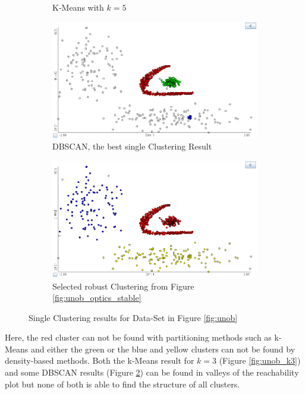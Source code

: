 \documentclass[
	a4paper,
	english,
	twoside,
	openright,               
	11pt                            
	]{report}
\begin{document}
\begin{figure}[h]
\begin{subfigure}[t]{.49\textwidth}
  \caption{K-Means with $k=5$}
  \label{fig:unob_k5ex}
\end{subfigure}
\hfill
\begin{subfigure}[t]{.49\textwidth}
  \centering
  \includegraphics[width=.98\linewidth]{unob_best}
  \caption{DBSCAN, the best single Clustering Result}
  \label{fig:unob_best}
\end{subfigure}
\medskip
\begin{subfigure}[t]{.49\textwidth}
	\centering
	\includegraphics[width=.98\linewidth]{unob_stable}
	\caption{Selected robust Clustering from Figure \ref{fig:unob_optics_stable}}
	\label{fig:unob_stable}
\end{subfigure}
\caption{Single Clustering results for Data-Set in Figure \ref{fig:unob}}
\label{fig:single}
\end{figure}


Here, the red cluster can not be found with partitioning methods such as k-Means and either the green or the blue and yellow clusters can not be found by density-based methods. Both the k-Means result for $k=3$ (Figure \ref{fig:unob_k3}) and some DBSCAN results (Figure \ref{fig:unob_best}) can be found in valleys of the reachability plot but none of both is able to find the structure of all clusters.
\end{document}
